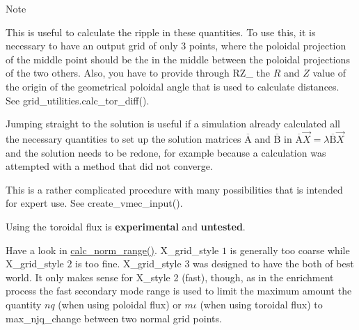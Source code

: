 \begin{DoxyNote}{Note}
\begin{DoxyEnumerate}
\item \label{page_inputs_fni32}%
%
This is useful to calculate the ripple in these quantities. To use this, it is necessary to have an output grid of only 3 points, where the poloidal projection of the middle point should be the in the middle between the poloidal projections of the two others. Also, you have to provide through {\ttfamily R\+Z\+\_} the $R$ and $Z$ value of the origin of the geometrical poloidal angle that is used to calculate distances. See grid\+\_\+utilities.\+calc\+\_\+tor\+\_\+diff().
\item \label{page_inputs_fni33}%
%
Jumping straight to the solution is useful if a simulation already calculated all the necessary quantities to set up the solution matrices $\overline{\text{A}}$ and $\overline{\text{B}}$ in $\overline{\text{A}} \vec{X} = \lambda \overline{\text{B}} \vec{X}$ and the solution needs to be redone, for example because a calculation was attempted with a method that did not converge.
\item \label{page_inputs_fni34}%
%
This is a rather complicated procedure with many possibilities that is intended for expert use. See create\+\_\+vmec\+\_\+input().
\item \label{page_inputs_fni35}%
%
Using the toroidal flux is {\bfseries experimental} and {\bfseries untested}.
\item \label{page_inputs_fni36}%
%
Have a look in \hyperlink{namespacegrid__ops_a596695cab6971ec6b9d32d13a50708b6}{calc\+\_\+norm\+\_\+range()}. {\ttfamily X\+\_\+grid\+\_\+style} $1$ is generally too coarse while {\ttfamily X\+\_\+grid\+\_\+style} $2$ is too fine. {\ttfamily X\+\_\+grid\+\_\+style} $3$ was designed to have the both of best world. It only makes sense for {\ttfamily X\+\_\+style} 2 (fast), though, as in the enrichment process the fast secondary mode range is used to limit the maximum amount the quantity $n q$ (when using poloidal flux) or $m \iota$ (when using toroidal flux) to {\ttfamily max\+\_\+njq\+\_\+change} between two normal grid points. 
\end{DoxyEnumerate}
\end{DoxyNote}
